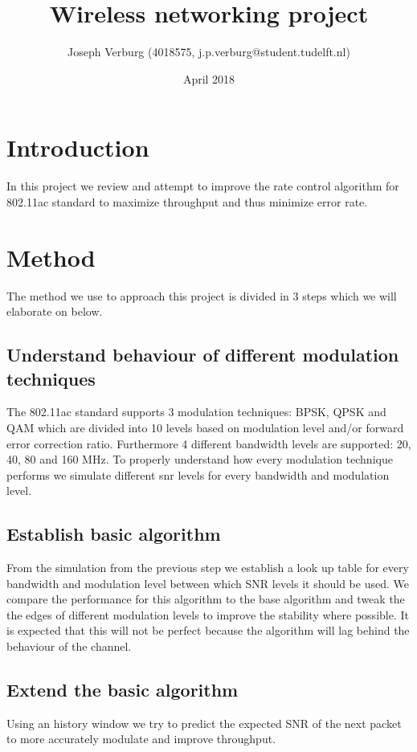 \documentclass[a4paper]{article}
\title{Wireless networking project}
\author{
    Joseph Verburg (4018575, j.p.verburg@student.tudelft.nl)
}
\date{April 2018}
\begin{document}
\maketitle

\section{Introduction}
In this project we review and attempt to improve the rate control algorithm for 802.11ac standard to maximize throughput and thus minimize error rate.
\section{Method}
The method we use to approach this project is divided in 3 steps which we will elaborate on below.

\subsection{Understand behaviour of different modulation techniques}
The 802.11ac standard supports 3 modulation techniques: BPSK, QPSK and QAM which are divided into 10 levels based on modulation level and/or forward error correction ratio. Furthermore 4 different bandwidth levels are supported: 20, 40, 80 and 160 MHz. To properly understand how every modulation technique performs we simulate different snr levels for every bandwidth and modulation level.
\subsection{Establish basic algorithm}
From the simulation from the previous step we establish a look up table for every bandwidth and modulation level between which SNR levels it should be used.
We compare the performance for this algorithm to the base algorithm and tweak the the edges of different modulation levels to improve the stability where possible. It is expected that this will not be perfect because the algorithm will lag behind the behaviour of the channel.
\subsection{Extend the basic algorithm}
Using an history window we try to predict the expected SNR of the next packet to more accurately modulate and improve throughput.
\end{document}
